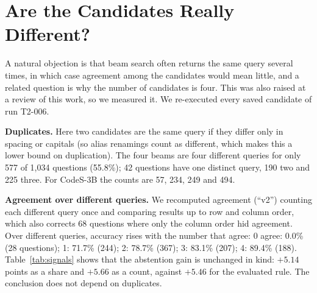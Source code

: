 \documentclass[conference]{IEEEtran}
\begin{document}
\section{Are the Candidates Really Different?}
\label{sec:diversity}
A natural objection is that beam search often returns the same query several times, in which case agreement among the candidates would mean little, and a related question is why the number of candidates is four. This was also raised at a review of this work, so we measured it. We re-executed every saved candidate of run T2-006.

\textbf{Duplicates.} Here two candidates are the same query if they differ only in spacing or capitals (so alias renamings count as different, which makes this a lower bound on duplication). The four beams are four different queries for only 577 of 1,034 questions (55.8\%); 42 questions have one distinct query, 190 two and 225 three. For CodeS-3B the counts are 57, 234, 249 and 494.

\textbf{Agreement over different queries.} We recomputed agreement (``v2'') counting each different query once and comparing results up to row and column order, which also corrects 68 questions where only the column order hid agreement. Over different queries, accuracy rises with the number that agree: 0 agree: 0.0\% (28 questions); 1: 71.7\% (244); 2: 78.7\% (367); 3: 83.1\% (207); 4: 89.4\% (188). Table~\ref{tab:signals} shows that the abstention gain is unchanged in kind: $+5.14$ points as a share and $+5.66$ as a count, against $+5.46$ for the evaluated rule. The conclusion does not depend on duplicates.
\end{document}
